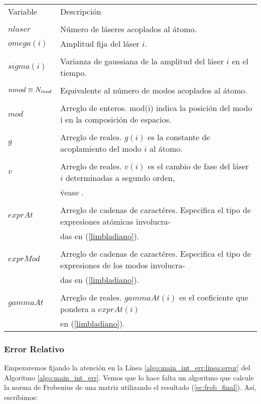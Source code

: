 \begin{tabular*}{\textwidth}{ll}
\hline\multirow{2}{*}{\large{Variable}}&\multirow{2}{*}{\large{Descripci\'on}}\\ &\\ \hline\\\vspace*{0.5cm}
$nlaser$ & N\'umero de l\'aseres acoplados al \'atomo.\\
$omega(i)$ & Amplitud fija del l\'aser $i$.\\\\
$sigma(i)$ & Varianza de gaussiana de la amplitud del l\'aser $i$ en el tiempo.\\\\
$nmod\equiv N_{mod}$ & Equivalente al n\'umero de modos acoplados al \'atomo.\\\\
$mod$ & Arreglo de enteros. mod(i) indica la posici\'on del modo i en la composici\'on de espacios.\\\\
$g$ & Arreglo de reales. $g(i)$ es la constante de acoplamiento del modo $i$ al \'atomo.\\\\
$v$ & Arreglo de reales. $v(i)$ es el cambio de fase del l\'aser $i$ determinadas a segundo orden,\\
    & \'vease \cite{robert}.\\\\
$exprAt$ & Arreglo de cadenas de caract\'eres. Especifica el tipo de expresiones at\'omicas involucra-\\
	&das en (\ref{limbladiano}).\\\\
$exprMod$ & Arreglo de cadenas de caract\'eres. Especifica el tipo de expresiones de los modos involucra-\\
	&das en (\ref{limbladiano}).\\\\
$gammaAt$ & Arreglo de reales. $gammaAt(i)$ es el coeficiente que pondera a $exprAt(i)$ \\
	  & en (\ref{limbladiano}).
\end{tabular*} 
\subsubsection{Error Relativo}
\quad Empezaremos fijando la atenci\'on en la L\'inea \ref{algo:main_int_err:linea:error} del Algoritmo \ref{algo:main_int_err}. Vemos que lo hace falta un algoritmo que calcule la norma de Frobenius de una matriz utilizando el resultado (\ref{ec:frob_final}). As\'i, escribimos:

